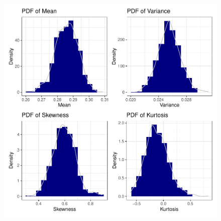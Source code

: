 \documentclass{article}\usepackage[]{graphicx}\usepackage[]{xcolor}
\begin{document}
   \begin{figure}[H]
    \begin{center}
       \includegraphics[scale=0.5]{moments.pdf}
       \caption{}
     \label{densityf}
     \end{center}
   \end{figure}
   
\end{document}
